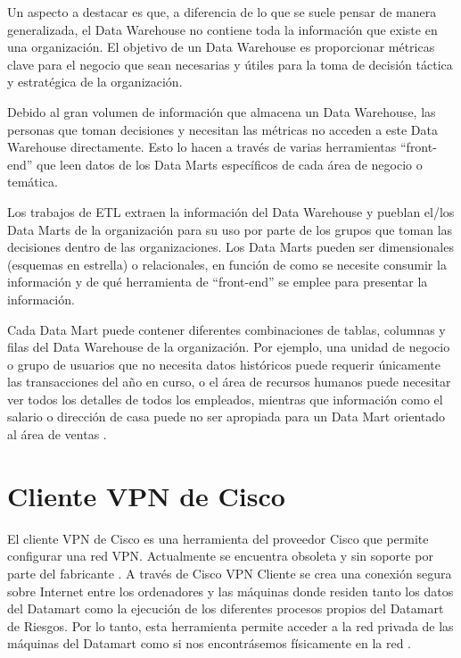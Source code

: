 \documentclass[a4paper, 12pt]{book}
\begin{document}
Un aspecto a destacar es que, a diferencia de lo que se suele pensar de manera generalizada, el Data Warehouse no contiene toda la información que existe en una organización. El objetivo de un Data Warehouse es proporcionar métricas clave para el negocio que sean necesarias y útiles para la toma de decisión táctica y estratégica de la organización.

Debido al gran volumen de información que almacena un Data Warehouse, las personas que toman decisiones y necesitan las métricas no acceden a este Data Warehouse directamente. Esto lo hacen a través de varias herramientas “front-end” que leen datos de los Data Marts específicos de cada área de negocio o temática.

Los trabajos de ETL extraen la información del Data Warehouse y pueblan el/los Data Marts de la organización para su uso por parte de los grupos que toman las decisiones dentro de las organizaciones. Los Data Marts pueden ser dimensionales (esquemas en estrella) o relacionales, en función de como se necesite consumir la información y de qué herramienta de “front-end” se emplee para presentar la información.

Cada Data Mart puede contener diferentes combinaciones de tablas, columnas y filas del Data Warehouse de la organización. Por ejemplo, una unidad de negocio o grupo de usuarios que no necesita datos históricos puede requerir únicamente las transacciones del año en curso, o el área de recursos humanos puede necesitar ver todos los detalles de todos los empleados, mientras que información como el salario o dirección de casa puede no ser apropiada para un Data Mart orientado al área de ventas \cite{dwh1,dwh2,dwh3,dwh4,dwh5,dwh6,dwh7,dwh8}.

\section{Cliente VPN de Cisco}
\label{sec:Cisco_VPN}

El cliente VPN de Cisco es una herramienta del proveedor Cisco que permite configurar una red VPN. Actualmente se encuentra obsoleta y sin soporte por parte del fabricante \cite{cisco01:_cisco_vpn_client01}. A través de Cisco VPN Cliente se crea una conexión segura sobre Internet entre los ordenadores y las máquinas donde residen tanto los datos del Datamart como la ejecución de los diferentes procesos propios del Datamart de Riesgos. Por lo tanto, esta herramienta permite acceder a la red privada de las máquinas del Datamart como si nos encontrásemos físicamente en la red \cite{cisco02:_cisco_vpn_client02}.
\end{document}
